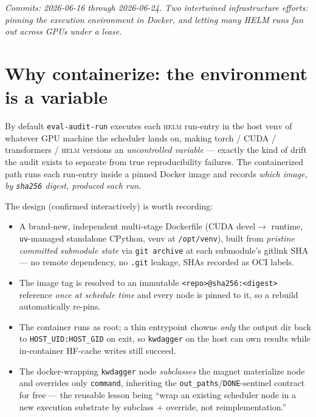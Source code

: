 \documentclass[11pt]{report}
\newcommand{\code}[1]{\texttt{#1}}
\begin{document}
\emph{Commits: 2026-06-16 through 2026-06-24. Two intertwined infrastructure
efforts: pinning the execution environment in Docker, and letting many HELM runs
fan out across GPUs under a lease.}

\section{Why containerize: the environment is a variable}

By default \code{eval-audit-run} executes each \textsc{helm} run-entry in the host
venv of whatever GPU machine the scheduler lands on, making torch / CUDA /
transformers / \textsc{helm} versions an \emph{uncontrolled variable} --- exactly
the kind of drift the audit exists to separate from true reproducibility failures.
The containerized path runs each run-entry inside a pinned Docker image and records
\emph{which image, by \code{sha256} digest, produced each run}.

The design (confirmed interactively) is worth recording:

\begin{itemize}[nosep]
  \item A brand-new, independent multi-stage Dockerfile (CUDA devel$\rightarrow$
        runtime, \code{uv}-managed standalone CPython, venv at \code{/opt/venv}),
        built from \emph{pristine committed submodule state} via \code{git archive}
        at each submodule's gitlink SHA --- no remote dependency, no \code{.git}
        leakage, SHAs recorded as OCI labels.
  \item The image tag is resolved to an immutable \code{<repo>@sha256:<digest>}
        reference \emph{once at schedule time} and every node is pinned to it, so a
        rebuild automatically re-pins.
  \item The container runs as root; a thin entrypoint chowns \emph{only} the output
        dir back to \code{HOST\_UID:HOST\_GID} on exit, so \code{kwdagger} on the
        host can own results while in-container HF-cache writes still succeed.
  \item The docker-wrapping \code{kwdagger} node \emph{subclasses} the magnet
        materialize node and overrides only \code{command}, inheriting the
        \code{out\_paths}/\code{DONE}-sentinel contract for free --- the reusable
        lesson being ``wrap an existing scheduler node in a new execution substrate
        by subclass + override, not reimplementation.''
\end{itemize}
\end{document}
